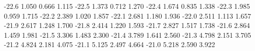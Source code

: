 -22.6 1.050 0.666 1.115
-22.5 1.373 0.712 1.270
-22.4 1.674 0.835 1.338
-22.3 1.985 0.959 1.715
-22.2 2.389 1.020 1.857
-22.1 2.681 1.180 1.936
-22.0 2.511 1.113 1.657
-21.9 2.617 1.248 1.700
-21.8 2.414 1.220 1.593
-21.7 2.827 1.517 1.738
-21.6 2.864 1.459 1.981
-21.5 3.306 1.483 2.300
-21.4 3.789 1.641 2.560
-21.3 4.798 2.151 3.705
-21.2 4.824 2.181 4.075
-21.1 5.125 2.497 4.664
-21.0 5.218 2.590 3.922
